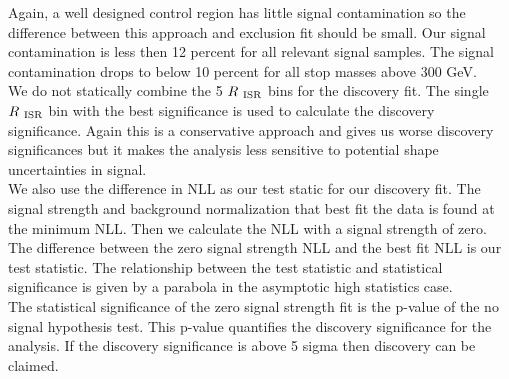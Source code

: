 \indent  Again, a well designed control region has little signal contamination so the difference between this approach and exclusion fit should be small.  Our signal contamination is less then 12 percent for all relevant signal samples.  The signal contamination drops to below 10 percent for all stop masses above 300 GeV.  \\  

\indent We do not statically combine the 5 $R_{~\mathrm{ISR}}$ bins for the discovery fit.  The single $R_{~\mathrm{ISR}}$ bin with the best significance is used to calculate the discovery significance.  Again this is a conservative approach and gives us worse discovery significances but it makes the analysis less sensitive to potential shape uncertainties in signal.  \\

\indent We also use the difference in NLL as our test static for our discovery fit.  The signal strength and background normalization that best fit the data is found at the minimum NLL.  Then we calculate the NLL with a signal strength of zero.  The difference between the zero signal strength NLL and the best fit NLL is our test statistic.  The relationship between the test statistic and statistical significance is given by a parabola in the asymptotic high statistics case. \\%

\indent The statistical significance of the zero signal strength fit is the p-value of the no signal hypothesis test.  This p-value quantifies the discovery significance for the analysis.  If the discovery significance is above 5 sigma then discovery can be claimed.\\

